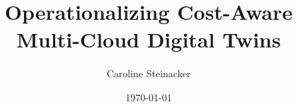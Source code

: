 \documentclass[a4paper]{styles/QEmaster}
\title{Operationalizing Cost-Aware Multi-Cloud Digital Twins}
\author{Caroline Steinacker}
\date{\today}
\begin{document}
	\maketitle
	

	\abstract{}
	
	\tableofcontents
	
	
	
	
	
	
	
	
	

	
	

	\listoffigures
	\listoftables
\end{document}
